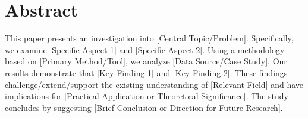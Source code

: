 \chapter*{Abstract}
This paper presents an investigation into [Central Topic/Problem]. Specifically, we examine [Specific Aspect 1] and [Specific Aspect 2]. Using a methodology based on [Primary Method/Tool], we analyze [Data Source/Case Study]. Our results demonstrate that [Key Finding 1] and [Key Finding 2]. These findings challenge/extend/support the existing understanding of [Relevant Field] and have implications for [Practical Application or Theoretical Significance]. The study concludes by suggesting [Brief Conclusion or Direction for Future Research].

